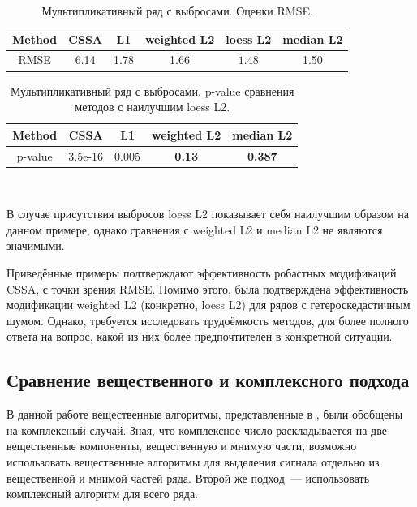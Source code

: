 \documentclass[specialist,
               substylefile = spbu.rtx,
               subf,href,colorlinks=true, 12pt]{disser}
\begin{document}
\begin{table}[H]
	\begin{center}
		\caption{Мультипликативный ряд с выбросами. Оценки RMSE.}
		\label{tab4}
		\begin{tabular}{|c|c|c|c|c|c|}
			\hline
			Method 	& CSSA & L1 & weighted L2 & loess L2 & median L2 \\
			\hline
			RMSE & 6.14  & 1.78  & 1.66 & $\mathbf{1.48}$ & 1.50 \\
			\hline
		\end{tabular}
	\end{center}
\end{table}

\begin{table}[H]
	\caption{Мультипликативный ряд с выбросами. p-value сравнения методов с наилучшим loess L2.}
	\label{tab: pval4}
	\begin{center}
		\begin{tabular}{|c|c|c|c|c|}
			\hline
			Method & CSSA	& L1 & weighted L2 & median L2 \\
			\hline
			p-value & 3.5e-16   & 0.005 &   \textbf{0.13}  &  \textbf{0.387} \\
			\hline
		\end{tabular} \\
	\end{center}
\end{table}

В случае присутствия выбросов loess L2 показывает себя наилучшим образом на данном примере, однако сравнения с weighted L2 и median L2 не являются значимыми.

Приведённые примеры подтверждают эффективность робастных модификаций CSSA, с точки зрения RMSE. Помимо этого, была подтверждена эффективность модификации weighted L2 (конкретно, loess L2) для рядов с гетероскедастичным шумом. Однако, требуется исследовать трудоёмкость методов, для более полного ответа на вопрос, какой из них более предпочтителен в конкретной ситуации.

\subsection{Сравнение вещественного и комплексного подхода} \label{sec:comp}

В данной работе вещественные алгоритмы, представленные в \cite{Tretyakova20}, были обобщены на комплексный случай. Зная, что комплексное число раскладывается на две вещественные компоненты, вещественную и мнимую части, возможно использовать вещественные алгоритмы для выделения сигнала отдельно из вещественной и мнимой частей ряда. Второй же подход~--- использовать комплексный алгоритм для всего ряда.
\end{document}

